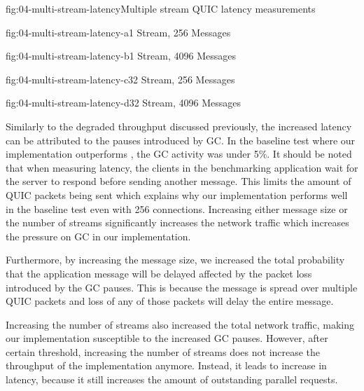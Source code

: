 \begin{myFigure}{fig:04-multi-stream-latency}{Multiple stream QUIC latency measurements}
\begin{mySubfigure}{0.49\linewidth}{fig:04-multi-stream-latency-a}{1 Stream, \SI{256}{\byte} Messages}
\footnotesize

\end{mySubfigure}
\begin{mySubfigure}{0.49\linewidth}{fig:04-multi-stream-latency-b}{1 Stream, \SI{4096}{\byte} Messages}
\footnotesize

\end{mySubfigure}

\begin{mySubfigure}{0.49\linewidth}{fig:04-multi-stream-latency-c}{32 Stream, \SI{256}{\byte} Messages}
\footnotesize

\end{mySubfigure}
\begin{mySubfigure}{0.49\linewidth}{fig:04-multi-stream-latency-d}{32 Stream, \SI{4096}{\byte} Messages}
\footnotesize

\end{mySubfigure}
\end{myFigure}

Similarly to the degraded throughput discussed previously, the increased latency can be attributed
to the pauses introduced by GC\@. In the baseline test where our implementation outperforms
\libmsquic{}, the GC activity was under 5\%. It should be noted that when measuring latency, the
clients in the benchmarking application wait for the server to respond before sending another
message. This limits the amount of QUIC packets being sent which explains why our implementation
performs well in the baseline test even with 256 connections. Increasing either message size or the
number of streams significantly increases the network traffic which increases the pressure on GC in
our implementation.

Furthermore, by increasing the message size, we increased the total probability that the application
message will be delayed affected by the packet loss introduced by the GC pauses. This is because the
message is spread over multiple QUIC packets and loss of any of those packets will delay the entire
message.

Increasing the number of streams also increased the total network traffic, making our implementation
susceptible to the increased GC pauses. However, after certain threshold, increasing the number of
streams does not increase the throughput of the implementation anymore. Instead, it leads to
increase in latency, because it still increases the amount of outstanding parallel requests.

